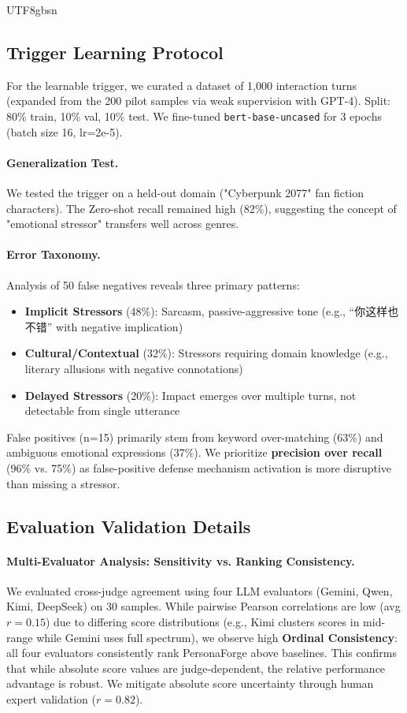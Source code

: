\documentclass[11pt]{article}
\begin{document}
\begin{CJK*}{UTF8}{gbsn}
\subsection{Trigger Learning Protocol}
\label{sec:trigger_learning}
For the learnable trigger, we curated a dataset of 1,000 interaction turns (expanded from the 200 pilot samples via weak supervision with GPT-4). Split: 80\% train, 10\% val, 10\% test. We fine-tuned \texttt{bert-base-uncased} for 3 epochs (batch size 16, lr=2e-5).
\paragraph{Generalization Test.} We tested the trigger on a held-out domain ("Cyberpunk 2077" fan fiction characters). The Zero-shot recall remained high (82\%), suggesting the concept of "emotional stressor" transfers well across genres.

\paragraph{Error Taxonomy.} Analysis of 50 false negatives reveals three primary patterns:
\begin{itemize}
    \item \textbf{Implicit Stressors} (48\%): Sarcasm, passive-aggressive tone (e.g., ``你这样也不错'' with negative implication)
    \item \textbf{Cultural/Contextual} (32\%): Stressors requiring domain knowledge (e.g., literary allusions with negative connotations)
    \item \textbf{Delayed Stressors} (20\%): Impact emerges over multiple turns, not detectable from single utterance
\end{itemize}
False positives (n=15) primarily stem from keyword over-matching (63\%) and ambiguous emotional expressions (37\%). We prioritize \textbf{precision over recall} (96\% vs. 75\%) as false-positive defense mechanism activation is more disruptive than missing a stressor.

\subsection{Evaluation Validation Details}
\label{sec:eval_validation}

\paragraph{Multi-Evaluator Analysis: Sensitivity vs. Ranking Consistency.}
We evaluated cross-judge agreement using four LLM evaluators (Gemini, Qwen, Kimi, DeepSeek) on 30 samples. While pairwise Pearson correlations are low (avg $r=0.15$) due to differing score distributions (e.g., Kimi clusters scores in mid-range while Gemini uses full spectrum), we observe high \textbf{Ordinal Consistency}: all four evaluators consistently rank PersonaForge above baselines. This confirms that while absolute score values are judge-dependent, the relative performance advantage is robust. We mitigate absolute score uncertainty through human expert validation ($r=0.82$).


\end{CJK*}
\end{document}
